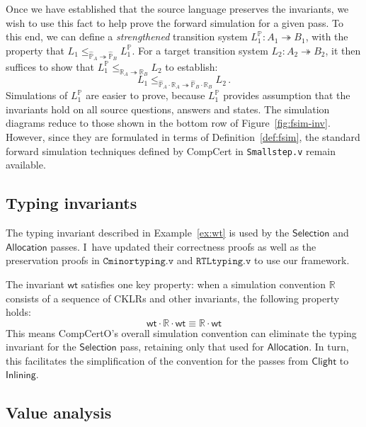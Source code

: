 \documentclass[11pt,oneside]{book}
\theoremstyle{definition}
\newcommand{\kw}[1]{\ensuremath{ \mathsf{#1} }}
\begin{document}
Once we have established that
the source language preserves the invariants,
we wish to use this fact to help prove the forward simulation
for a given pass.
To this end,
we can define a \emph{strengthened} transition system
$L_1^\mathbb{P} : A_1 \twoheadrightarrow B_1$,
with the property that
$
   L_1 \le_{\hat{\mathbb{P}}_A \twoheadrightarrow \hat{\mathbb{P}}_B}
   L_1^\mathbb{P}
$.
For a target transition system $L_2 : A_2 \twoheadrightarrow B_2$,
it then suffices to show that
$
  L_1^\mathbb{P}
  \le_{\mathbb{R}_A \twoheadrightarrow \mathbb{R}_B}
  L_2
$
to establish:
\[
  L_1
  \le_{\hat{\mathbb{P}}_A \cdot \mathbb{R}_A \twoheadrightarrow
       \hat{\mathbb{P}}_B \cdot \mathbb{R}_B}
  L_2 \,.
\]
Simulations of $L_1^\mathbb{P}$
are easier to prove,
because $L_1^\mathbb{P}$
provides assumption that the invariants hold
on all source questions, answers and states.
The simulation diagrams
reduce to those shown in the bottom row of
Figure~\ref{fig:fsim-inv}.
However, since they are formulated in terms of
Definition~\ref{def:fsim},
the standard forward simulation techniques
defined by CompCert
in \texttt{Smallstep.v}
remain available.


\subsection{Typing invariants} \label{sec:wt} %

The typing invariant described in Example~\ref{ex:wt}
is used by the $\kw{Selection}$ and $\kw{Allocation}$ passes.
I~have updated their correctness proofs
as well as the preservation proofs in
$\texttt{Cminortyping.v}$ and $\texttt{RTLtyping.v}$
to use our framework.

The invariant $\kw{wt}$ satisfies one key property:
when a simulation convention $\mathbb{R}$
consists of a sequence of CKLRs and other invariants,
the following property holds:
\[
  \kw{wt} \cdot \mathbb{R} \cdot \kw{wt} \equiv
  \mathbb{R} \cdot \kw{wt}
\]
This means CompCertO's overall simulation convention
can eliminate the typing invariant for the $\kw{Selection}$ pass,
retaining only that used for $\kw{Allocation}$.
In turn, this facilitates the simplification of the convention for
the passes from \kw{Clight} to \kw{Inlining}.


\subsection{Value analysis} \label{sec:va} %
\end{document}
